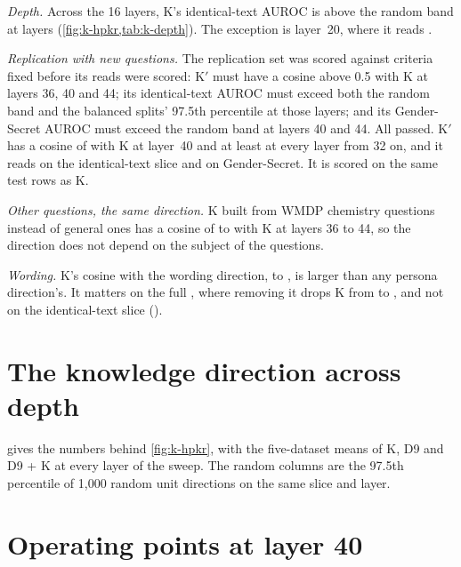 \emph{Depth.} Across the 16 layers, K's identical-text AUROC is above the random band at
 layers (\cref{fig:k-hpkr,tab:k-depth}). The exception is layer~20, where it
reads .

\emph{Replication with new questions.} The replication set was scored against
 criteria fixed before its reads were scored: K$'$ must have a cosine above 0.5
with K at layers 36, 40 and 44; its identical-text AUROC must exceed both the random band and the
balanced splits' 97.5th percentile at those layers; and its Gender-Secret AUROC must exceed the random
band at layers 40 and 44. All passed. K$'$ has a cosine of  with K at layer~40 and
at least  at every layer from 32 on, and it reads  on the
identical-text slice and  on Gender-Secret. It is scored on the same test rows as K.

\emph{Other questions, the same direction.} K built from WMDP chemistry questions instead of general
ones has a cosine of  to  with K at layers 36 to 44, so the
direction does not depend on the subject of the questions.

\emph{Wording.} K's cosine with the wording direction,  to , is
larger than any persona direction's. It matters on the full \hpkr, where removing it drops K from
 to , and not on the identical-text slice
().

\section*{The knowledge direction across depth}

 gives the numbers behind \cref{fig:k-hpkr}, with the five-dataset means of K, D9
and D9 + K at every layer of the sweep. The random columns are the 97.5th percentile of 1,000 random
unit directions on the same slice and layer.

\begin{table}[h]
\centering
\small
\caption{K, K$'$ and the combinations across the 16 layers (AUROC).}
\label{tab:k-depth}
\fittable{}
\end{table}

\section*{Operating points at layer 40}

